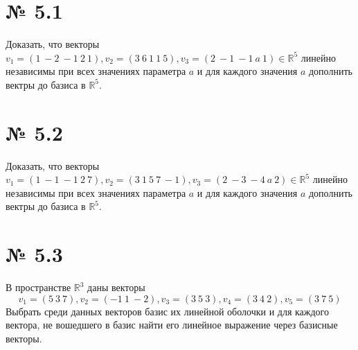\documentclass[a4paper,11pt]{report}
\begin{document}
\section{№ 5.1}
Доказать, что векторы $v_1 = (1\ -2\ -1\ 2\ 1), v_2 = (3\ 6\ 1\ 1\ 5), v_3 = (2\ -1\ -1\ a\ 1) \in \mathbb{R}^5$ линейно независимы
при всех значениях параметра $a$ и для каждого значения $a$ дополнить вектры до базиса в $\mathbb{R}^5$.
\section{№ 5.2}
Доказать, что векторы $v_1 = (1\ -1\ -1\ 2\ 7), v_2 = (3\ 1\ 5\ 7\ -1), v_3 = (2\ -3\ -4\ a\ 2) \in \mathbb{R}^5$ линейно независимы
при всех значениях параметра $a$ и для каждого значения $a$ дополнить вектры до базиса в $\mathbb{R}^5$.
\section{№ 5.3}
В пространстве $\mathbb{R}^3$ даны векторы
\[
v_1 = (5\ 3\ 7), v_2 = (-1\ 1\ -2), v_3 = (3\ 5\ 3), v_4 = (3\ 4\ 2), v_5 = (3\ 7\ 5)
\]
Выбрать среди данных векторов базис их линейной оболочки и для каждого вектора, не вошедшего в базис найти его
линейное выражение через базисные векторы.
\end{document}
